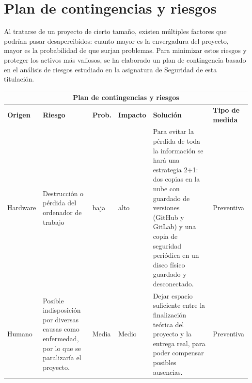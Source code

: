 \section{Plan de contingencias y riesgos}\label{sec:plan-contingencias}
Al tratarse de un proyecto de cierto tamaño, existen múltiples factores que podrían pasar desapercibidos: cuanto mayor es la envergadura del proyecto, mayor es la probabilidad de que surjan problemas. Para minimizar estos riesgos y proteger los activos más valiosos, se ha elaborado un plan de contingencia basado en el análisis de riesgos estudiado en la asignatura de Seguridad de esta titulación.
\begin{table}[h!]
    \centering
    \small
    \begin{tabular}{|p{1.5cm}|p{2.5cm}|p{1.5cm}|p{1.5cm}|p{3.8cm}|p{1.8cm}|}
        \hline
        \multicolumn{6}{|c|}{\textbf{Plan de contingencias y riesgos}}                                                                                                                                                                                                                                                                                                                                                                                                                                   \\
        \hline
        \textbf{Origen} & \textbf{Riesgo}                                                                                                                                                              & \textbf{Prob.} & \textbf{Impacto} & \textbf{Solución}                                                                                                                                                                                                          & \textbf{Tipo de medida} \\
        \hline
        Hardware        & Destrucción o pérdida del ordenador de trabajo                                                                                                                               & baja                  & alto             & Para evitar la pérdida de toda la información se hará una estrategia 2+1: dos copias en la nube con guardado de versiones (GitHub y GitLab) y una copia de seguridad periódica en un disco físico guardado y desconectado. & Preventiva              \\
        \hline
        Humano          &  Posible indisposición por diversas causas como enfermedad, por lo que se paralizaría el proyecto. & Media                 & Medio            & Dejar espacio suficiente entre la finalización teórica del proyecto y la entrega real, para poder compensar posibles ausencias.                                                                                            & Preventiva              \\

\end{tabular}
\end{table}
